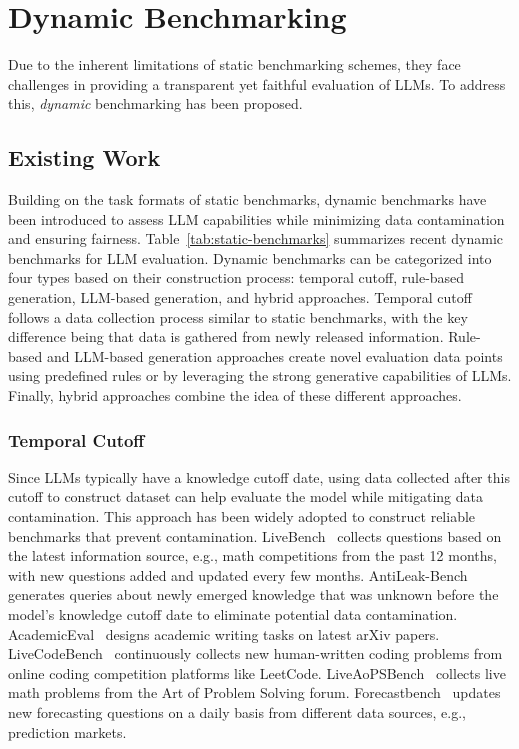 \section{Dynamic Benchmarking}
\label{sec:dynamic}

Due to the inherent limitations of static benchmarking schemes, they face challenges in providing a transparent yet faithful evaluation of LLMs. To address this, \textit{dynamic} benchmarking has been proposed.  

% 











\subsection{Existing Work}


Building on the task formats of static benchmarks, dynamic benchmarks have been introduced to assess LLM capabilities while minimizing data contamination and ensuring fairness. 
Table~\ref{tab:static-benchmarks} summarizes recent dynamic benchmarks for LLM evaluation.
Dynamic benchmarks can be categorized into four types based on their construction process: temporal cutoff, rule-based generation, LLM-based generation, and hybrid approaches.
Temporal cutoff follows a data collection process similar to static benchmarks, with the key difference being that data is gathered from newly released information.
Rule-based and LLM-based generation approaches create novel evaluation data points using predefined rules or by leveraging the strong generative capabilities of LLMs.
Finally, hybrid approaches combine the idea of these different approaches.

\subsubsection{Temporal Cutoff} 
Since LLMs typically have a knowledge cutoff date, using data collected after this cutoff to construct dataset can help evaluate the model while mitigating data contamination. 
This approach has been widely adopted to construct reliable benchmarks that prevent contamination.
LiveBench~\citep{white2024livebench} collects questions based on the latest information source, e.g., math competitions from the past 12 months, with new questions added and updated every few months.
AntiLeak-Bench~\citep{wu2024antileak} generates queries about newly emerged knowledge that was unknown before the model's knowledge cutoff date to eliminate potential data contamination.
AcademicEval~\citep{zhang2024academiceval} designs academic writing tasks on latest arXiv papers.
LiveCodeBench~\citep{jain2024livecodebenchholisticcontaminationfree} continuously collects new human-written coding problems from online coding competition platforms like LeetCode.
LiveAoPSBench~\citep{mahdavi2025leveraging} collects live math problems from the Art of Problem Solving forum.
Forecastbench~\citep{smith2024forecastbench} updates new forecasting questions on a daily basis from different data sources, e.g., prediction markets.


